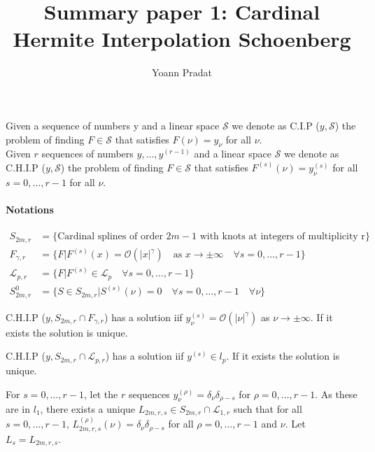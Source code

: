 \documentclass[a4paper, 11pt]{article}
\begin{document}
\title{Summary paper 1: Cardinal Hermite Interpolation Schoenberg}
\author{Yoann Pradat}
\maketitle

Given a sequence of numbers y and a linear space $\mathcal{S}$ we denote as C.I.P ($y, \mathcal{S}$) the problem of 
finding $F \in \mathcal{S}$ that satisfies $F(\nu) = y_{\nu}$ for all $\nu$.  \\

Given $r$ sequences of numbers $y, \ldots, y^{(r-1)}$ and a linear space $\mathcal{S}$ we denote as C.H.I.P ($y, 
\mathcal{S}$) the problem of finding $F \in \mathcal{S}$ that satisfies $F^{(s)}(\nu) = y^{(s)}_{\nu}$ for all $s = 0, 
\ldots, r-1$ for all $\nu$.  \\

\paragraph{Notations} 

\begin{align}
  S_{2m, r} &= \{\text{Cardinal splines of order $2m-1$ with knots at integers of multiplicity r}\} \\
  F_{\gamma,r} &= \{F | F^{(s)}(x) = \mathcal{O}(|x|^{\gamma}) \quad \text{as }  x \to \pm \infty \quad \forall s=0, 
  \ldots, r-1\} \\
  \mathcal{L}_{p,r} &= \{F | F^{(s)} \in \mathcal{L}_p \quad \forall s=0, \ldots, r-1\}\\
  S^0_{2m, r} &= \{S \in S_{2m,r} | S^{(s)}(\nu)=0 \quad \forall s=0, \ldots, r-1 \quad \forall \nu\}
\end{align}

\begin{thm}{1}
  C.H.I.P ($y, S_{2m,r} \cap F_{\gamma, r}$) has a solution iif $y^{(s)}_{\nu} = \mathcal{O}(|\nu|^{\gamma})$ as $\nu 
  \to \pm \infty$. If it exists the solution is unique.
\end{thm}

\begin{thm}{2}
  C.H.I.P ($y, S_{2m,r} \cap \mathcal{L}_{p, r}$) has a solution iif $y^{(s)} \in l_p$. If it exists the solution is 
  unique.
\end{thm}

For $s=0, \ldots, r-1$, let the $r$ sequences $y^{(\rho)}_{\nu} = \delta_{\nu}\delta_{\rho-s}$ for $\rho=0, \ldots, 
r-1$. As these are in $l_1$, there exists a unique $L_{2m, r, s} \in  S_{2m,r} \cap \mathcal{L}_{1, r}$ such that for 
all $s=0, \ldots, r-1$, $L_{2m, r, s}^{(\rho)}(\nu) = \delta_{\nu}\delta_{\rho-s}$ for all $\rho=0, \ldots, r-1$ and 
$\nu$. Let $L_s = L_{2m, r, s}$. 
\end{document}
